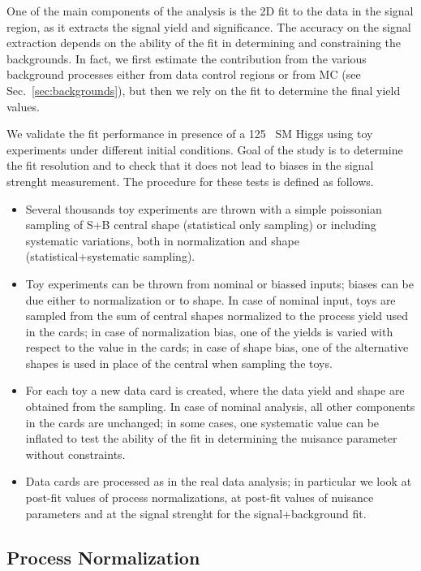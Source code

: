 One of the main components of the analysis is the 2D fit to the data in the signal region, 
as it extracts the signal yield and significance.
The accuracy on the signal extraction depends on the ability of the fit in determining 
and constraining the backgrounds.
In fact, we first estimate the contribution from the various background processes 
either from data control regions or from MC (see Sec.~\ref{sec:backgrounds}), 
but then we rely on the fit to determine the final yield values. 

We validate the fit performance in presence of a 125 \GeV\ SM Higgs using toy experiments 
under different initial conditions.
Goal of the study is to determine the fit resolution and to check that it does not lead to 
biases in the signal strenght measurement. 
The procedure for these tests is defined as follows.

\begin{itemize}
\item Several thousands toy experiments are thrown with a simple poissonian sampling of S+B central shape (statistical only sampling)
or including systematic variations, both in normalization and shape (statistical+systematic sampling). 
\item Toy experiments can be thrown from nominal or biassed inputs; biases can be due either to normalization or to shape. 
In case of nominal input, toys are sampled from the sum of central shapes normalized to the process yield used in the cards;
in case of normalization bias, one of the yields is varied with respect to the value in the cards; 
in case of shape bias, one of the alternative shapes is used in place of the central when sampling the toys.
\item For each toy a new data card is created, where the data yield and shape are obtained from the sampling.
In case of nominal analysis, all other components in the cards are unchanged; 
in some cases, one systematic value can be inflated to test the ability of the fit in determining 
the nuisance parameter without constraints.
\item Data cards are processed as in the real data analysis; in particular we look at post-fit values of process normalizations, 
at post-fit values of nuisance parameters and at the signal strenght for the signal+background fit.
\end{itemize}

\subsection{Process Normalization}

